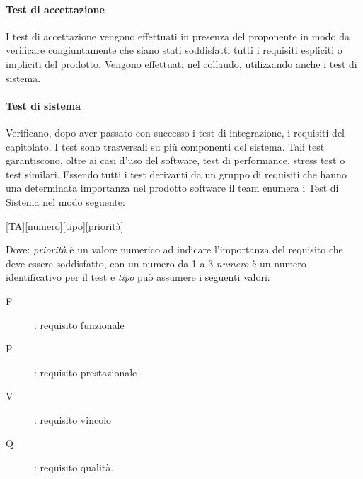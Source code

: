 \documentclass[../../norme-di-progetto.tex]{subfiles}
\begin{document}
\paragraph{Test di accettazione}
I test di accettazione vengono effettuati in presenza del proponente in modo da verificare congiuntamente che siano stati soddisfatti tutti i requisiti espliciti o impliciti del prodotto.
Vengono effettuati nel collaudo, utilizzando anche i test di sistema.

\paragraph{Test di sistema}
Verificano, dopo aver passato con successo i test di integrazione, i requisiti del capitolato. I test sono trasversali su più componenti del sistema.
Tali test garantiscono, oltre ai casi d'uso del software, test di performance, stress test o test similari.
Essendo tutti i test derivanti da un gruppo di requisiti che hanno una determinata importanza nel prodotto software il team enumera i Test di Sistema nel modo seguente:
\begin{center}
    [TA][numero][tipo][priorità]
\end{center}
Dove: \textit{priorità} è un valore numerico ad indicare l'importanza del requisito che deve essere soddisfatto, con un numero da 1 a 3 \textit{numero} è un numero identificativo per il test e \textit{tipo} può assumere i seguenti valori:
\begin{description}
  \item [F]: requisito funzionale
  \item [P]: requisito prestazionale
  \item [V]: requisito vincolo
  \item [Q]: requisito qualità.
\end{description}
\end{document}
